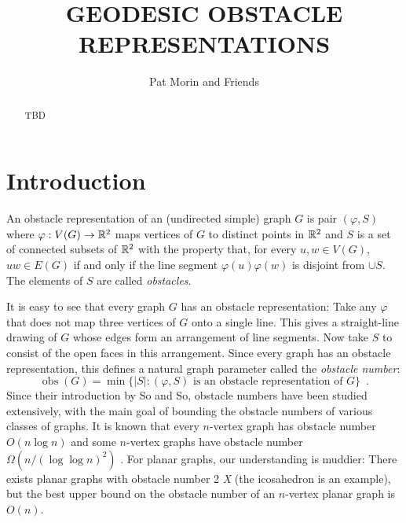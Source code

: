 \documentclass{patmorin}
\title{\MakeUppercase{Geodesic Obstacle Representations}}
\author{Pat Morin and Friends}%
\DeclareMathOperator{\ob}{obs}
\begin{document}
\begin{titlepage}
\maketitle

\begin{abstract}
  TBD
\end{abstract}
\end{titlepage}

\tableofcontents

\newpage


\section{Introduction}

An obstacle representation of an (undirected simple) graph $G$ is
pair $(\varphi, S)$ where $\varphi:V(G)\to\mathbb{R}^2$ maps vertices of $G$
to distinct points in $\mathbb{R}^2$ and $S$ is a set of connected subsets of
$\mathbb{R}^2$ with the property that, for every $u,w\in V(G)$, $uw\in E(G)$
if and only if the line segment $\varphi(u)\varphi(w)$ is disjoint from
$\cup S$.  The elements of $S$ are called \emph{obstacles}.

It is easy to see that every graph $G$ has an obstacle representation:
Take any $\varphi$ that does not map three vertices of $G$ onto a single
line. This gives a straight-line drawing of $G$ whose edges form an
arrangement of line segments.  Now take $S$ to consist of the open faces
in this arrangement.  Since every graph has an obstacle representation,
this defines a natural graph parameter called the \emph{obstacle number}:
\[
     \ob(G) = \min\{|S| :\text{$(\varphi, S)$ is an obstacle representation of $G$}\} \enspace .
\]
Since their introduction by So and So, obstacle numbers have been studied
extensively, with the main goal of bounding the obstacle numbers of
various classes of graphs.  It is known that every $n$-vertex graph has
obstacle number $O(n\log n)$ \cite{X} and some $n$-vertex graphs have
obstacle number $\Omega(n/(\log\log n)^2)$ \cite{Y}.  For planar graphs,
our understanding is muddier: There exists planar graphs with obstacle
number 2 \emph{X} (the icosahedron is an example), but the best upper
bound on the obstacle number of an $n$-vertex planar graph is $O(n)$.
\end{document}
